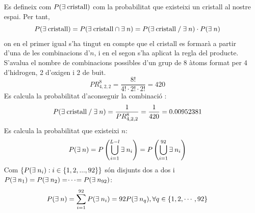 \documentclass[12pt]{report}
\begin{document}
Es defineix com $P(\exists\hspace{0.25em} \text{cristall})$ com la probabilitat que existeixi un cristall al nostre espai. 
\newline Per tant, 
$$P(\exists\hspace{0.25em}\text{cristall})= P(\exists \hspace{0.25em}\text{cristall} \cap \exists\hspace{0.25em} n) =P(\exists\hspace{0.25em}\text{cristall} \hspace{0.25em} / \hspace{0.25em}\exists \hspace{0.25em}n)\cdot P(\exists \hspace{0.25em}n)$$
on en el primer igual s'ha tingut en compte que el cristall es formarà a partir d'una de les combinacions d'$n$, i en el segon s'ha aplicat la regla del producte.\\
S'avalua el nombre de combinacions possibles d'un grup de 8 àtoms format per 4 d'hidrogen, 2 d'oxigen i 2 de buit.
$$PR^{8}_{4,2,2}=\frac{8!}{4!\cdot2!\cdot2!}=420$$
Es calcula la probabilitat d'aconseguir la combinació :
$$P(\exists \hspace{0.25em} \text{cristall} \hspace{0.25em} / \hspace{0.25em} \exists \hspace{0.25em} n)=\frac{1}{PR^{8}_{4,2,2}}=\frac{1}{420}=0.00952381$$
Es calcula la probabilitat que existeixi $n$:
\begin{equation}
    P(\exists \hspace{0.25em} n)=P\left( \bigcup_{i=1}^{L-l} \exists \hspace{0.25em} n_i\right)=P\left(\bigcup_{i=1}^{92}\exists \hspace{0.25em} n_i\right)
    \label{disjuntos}
\end{equation}
Com $\{P(\exists \hspace{0.25em} n_i) : i\in\{1,2,...,92\}\}$ són disjunts dos a dos i $P(\exists \hspace{0.25em} n_1)=P(\exists \hspace{0.25em} n_2)= \hspace{-0.2em}\cdots\hspace{-0.2em}=P(\exists \hspace{0.25em} n_{92})$:
\begin{equation*}
    P(\exists \hspace{0.25em} n)=\sum_{i=1}^{92}P(\exists \hspace{0.25em} n_i)=92P(\exists \hspace{0.25em} n_q), \forall q \in \{1,2,\cdots,92\}
\end{equation*}
\end{document}
